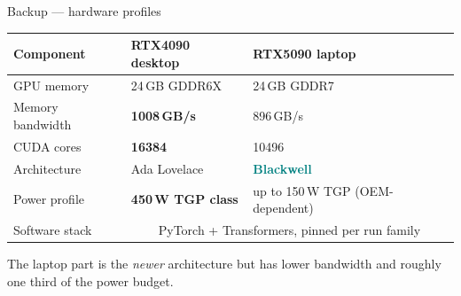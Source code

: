 \documentclass[aspectratio=169, 11pt]{beamer}
\begin{document}
\begin{frame}{Backup --- hardware profiles}
  \centering
  {\small
  \begin{tabular}{@{}l@{\hskip 16pt}l@{\hskip 16pt}l@{}}
    \toprule
    \textbf{Component} & \textbf{RTX4090 desktop} & \textbf{RTX5090 laptop}\\
    \midrule
    GPU memory       & 24\,GB GDDR6X & 24\,GB GDDR7\\
    Memory bandwidth & \textcolor{accent}{\textbf{1008\,GB/s}} & 896\,GB/s\\
    CUDA cores       & \textcolor{accent}{\textbf{16384}} & 10496\\
    Architecture     & Ada Lovelace & \textcolor{teal}{\textbf{Blackwell}}\\
    Power profile    & \textcolor{accent}{\textbf{450\,W TGP class}} & up to 150\,W TGP (OEM-dependent)\\
    Software stack   & \multicolumn{2}{c}{PyTorch + Transformers, pinned per run family}\\
    \bottomrule
  \end{tabular}}
  \vskip12pt
  {\small\color{ink2}The laptop part is the \emph{newer} architecture but has
  lower bandwidth and roughly \alert{one third of the power budget}.}
\end{frame}
\end{document}
